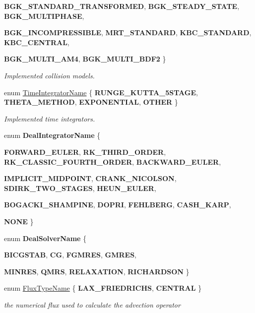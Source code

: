 \begin{DoxyCompactItemize}
{\bfseries BGK\_\-STANDARD\_\-TRANSFORMED}, 
{\bfseries BGK\_\-STEADY\_\-STATE}, 
{\bfseries BGK\_\-MULTIPHASE}, 
\par
{\bfseries BGK\_\-INCOMPRESSIBLE}, 
{\bfseries MRT\_\-STANDARD}, 
{\bfseries KBC\_\-STANDARD}, 
{\bfseries KBC\_\-CENTRAL}, 
\par
{\bfseries BGK\_\-MULTI\_\-AM4}, 
{\bfseries BGK\_\-MULTI\_\-BDF2}
 \}
\begin{DoxyCompactList}\small\item\em Implemented collision models. \item\end{DoxyCompactList}\item 
enum \hyperlink{namespacenatrium_a00a0ec1e80f138680e0fcca78349f6d8}{TimeIntegratorName} \{ {\bfseries RUNGE\_\-KUTTA\_\-5STAGE}, 
{\bfseries THETA\_\-METHOD}, 
{\bfseries EXPONENTIAL}, 
{\bfseries OTHER}
 \}
\begin{DoxyCompactList}\small\item\em Implemented time integrators. \item\end{DoxyCompactList}\item 
enum {\bfseries DealIntegratorName} \{ \par
{\bfseries FORWARD\_\-EULER}, 
{\bfseries RK\_\-THIRD\_\-ORDER}, 
{\bfseries RK\_\-CLASSIC\_\-FOURTH\_\-ORDER}, 
{\bfseries BACKWARD\_\-EULER}, 
\par
{\bfseries IMPLICIT\_\-MIDPOINT}, 
{\bfseries CRANK\_\-NICOLSON}, 
{\bfseries SDIRK\_\-TWO\_\-STAGES}, 
{\bfseries HEUN\_\-EULER}, 
\par
{\bfseries BOGACKI\_\-SHAMPINE}, 
{\bfseries DOPRI}, 
{\bfseries FEHLBERG}, 
{\bfseries CASH\_\-KARP}, 
\par
{\bfseries NONE}
 \}
\item 
enum {\bfseries DealSolverName} \{ \par
{\bfseries BICGSTAB}, 
{\bfseries CG}, 
{\bfseries FGMRES}, 
{\bfseries GMRES}, 
\par
{\bfseries MINRES}, 
{\bfseries QMRS}, 
{\bfseries RELAXATION}, 
{\bfseries RICHARDSON}
 \}
\item 
enum \hyperlink{namespacenatrium_a9366e68e932696b3dc277fc010ac1057}{FluxTypeName} \{ {\bfseries LAX\_\-FRIEDRICHS}, 
{\bfseries CENTRAL}
 \}
\begin{DoxyCompactList}\small\item\em the numerical flux used to calculate the advection operator \item\end{DoxyCompactList}\item 

\end{DoxyCompactItemize}
